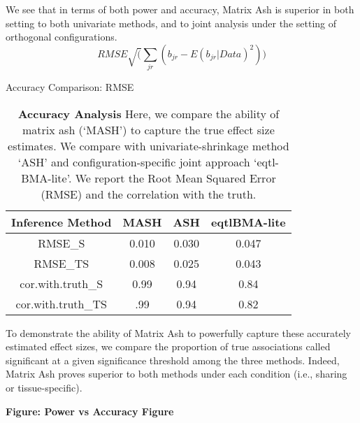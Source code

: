 We see that in terms of both power and accuracy, Matrix Ash is superior in both setting to both univariate methods, and to joint analysis under the setting of orthogonal configurations.
\begin{equation}
RMSE \sqrt(\sum_{jr}(b_{jr}-E(b_{jr}|Data)^2))
\end{equation}
\begin{table}[ht]
\caption{Accuracy Comparison: RMSE}
\centering
\begin{tabular}{c c c c}
\hline\hline
Inference Method & MASH & ASH & eqtlBMA-lite \\ [0.5ex] %
\hline
RMSE_{S}&0.010&0.030&0.047\\
RMSE_{TS}&0.008& 0.025&0.043 \\%
cor.with.truth_{S}&0.99&0.94&0.84\\
cor.with.truth_{TS}&.99&0.94&0.82\\
\hline
\end{tabular}
\label{table:RMSE}
\caption{\textbf{Accuracy Analysis} Here, we compare the ability of matrix ash (`MASH') to capture the true effect size estimates. We compare with univariate-shrinkage method `ASH' and configuration-specific joint approach `eqtl-BMA-lite'. We report the Root Mean Squared Error (RMSE) and the correlation with the truth.}
\end{table}

To demonstrate the ability of Matrix Ash to powerfully capture these accurately estimated effect sizes, we compare the proportion of true associations called significant at a given significance threshold among the three methods. Indeed, Matrix Ash  proves superior to both methods under each condition (i.e., sharing or tissue-specific). \newline


\textbf{Figure: Power vs Accuracy Figure}
\newline

